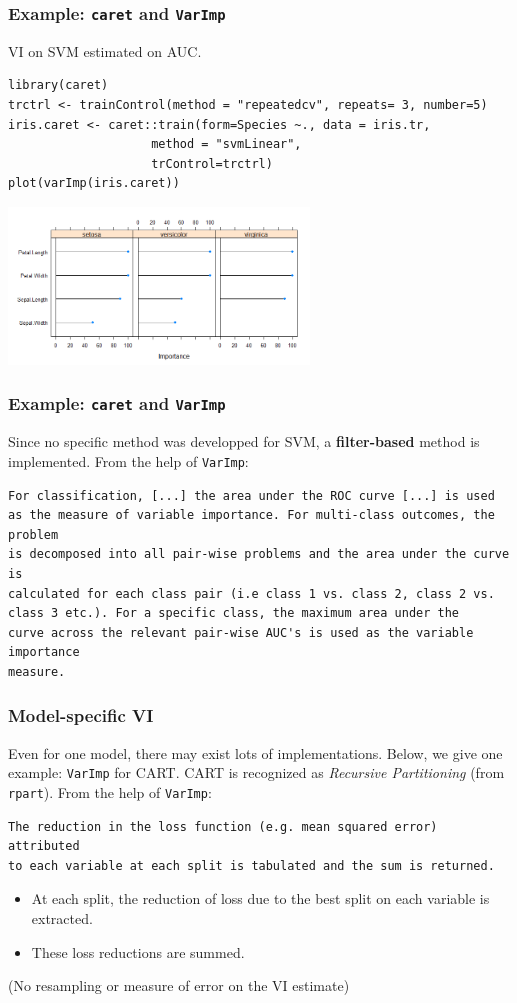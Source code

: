 \begin{frame}[fragile]
\frametitle{Example: {\tt caret} and {\tt VarImp}}
VI on SVM estimated on AUC.
\scriptsize
\begin{verbatim}
library(caret)
trctrl <- trainControl(method = "repeatedcv", repeats= 3, number=5)
iris.caret <- caret::train(form=Species ~., data = iris.tr, 
                    method = "svmLinear", 
                    trControl=trctrl)
plot(varImp(iris.caret))
\end{verbatim}
\normalsize
\begin{center}
\includegraphics[width=8cm]{../Graphs/VarImp_caret_svm.png}
\end{center}
\end{frame}
\begin{frame}[fragile]
\frametitle{Example: {\tt caret} and {\tt VarImp}}
Since no specific method was developped for SVM, a {\bf filter-based} method is implemented. From the help of {\tt VarImp}:\\
\scriptsize
\begin{verbatim}
For classification, [...] the area under the ROC curve [...] is used 
as the measure of variable importance. For multi-class outcomes, the problem 
is decomposed into all pair-wise problems and the area under the curve is
calculated for each class pair (i.e class 1 vs. class 2, class 2 vs. 
class 3 etc.). For a specific class, the maximum area under the 
curve across the relevant pair-wise AUC's is used as the variable importance 
measure.
\end{verbatim}
\normalsize
\end{frame}
\begin{frame}[fragile]
\frametitle{Model-specific VI}
Even for one model, there may exist lots of implementations. Below, we give one example: {\tt VarImp} for CART. CART is recognized as {\it Recursive Partitioning} (from {\tt rpart}). From the help of {\tt VarImp}:\\
\scriptsize
\begin{verbatim}
The reduction in the loss function (e.g. mean squared error) attributed 
to each variable at each split is tabulated and the sum is returned. 
\end{verbatim}
\normalsize
\begin{itemize}
\item At each split, the reduction of loss due to the best split on each variable is extracted.
\item These loss reductions are summed. 
\end{itemize}
(No resampling or measure of error on the VI estimate)
\end{frame}
